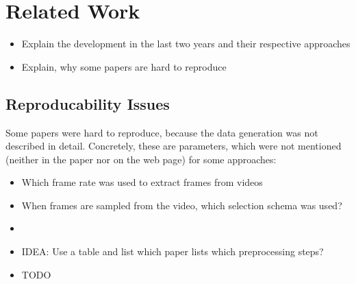 \section{Related Work}
\label{sec:related}

\begin{itemize}
	\item Explain the development in the last two years and their respective approaches
	\item Explain, why some papers are hard to reproduce
\end{itemize}

\subsection{Reproducability Issues}
Some papers were hard to reproduce, because the data generation was not described in detail.
Concretely, these are parameters, which were not mentioned (neither in the paper nor on the web page) for some approaches:
\begin{itemize}
	\item Which frame rate was used to extract frames from videos
	\item When frames are sampled from the video, which selection schema was used?
	\item 
	\item IDEA: Use a table and list which paper lists which preprocessing steps?
	\item TODO
\end{itemize}